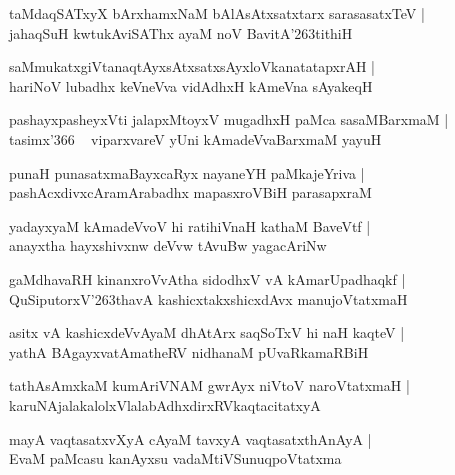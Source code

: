 \documentclass[twoside,12pt,openright]{book}
\def\S{\char'263}
\newcounter{shloka}[chapter]
\begin{document}
\begin{shloka}
taMdaqSATxyX bArxhamxNaM bAlAsAtxsatxtarx sarasasatxTeV |\\
ja{}haqSuH kwtukAviSAThx ayaM noV BavitA\S tithiH
\end{shloka}

\begin{shloka}
saMmukatxgiVtanaqtAyxsAtxsatxsAyxloVkanatatapxrAH |\\
hariNoV lubadhx keVneVva vidAdhxH kAmeVna sAyakeqH 
\end{shloka}

\begin{shloka}
pashayxpasheyxVti jalapxMtoyxV mugadhxH paMca sasaMBarxmaM |\\
tasimx\char'366 ~ viparxvareV yUni kAmadeVvaBarxmaM yayuH 
\end{shloka}

\begin{shloka}
punaH punasatxmaBayxcaRyx nayaneYH paMkajeYriva |\\
pashAcxdivxcAramArabadhx mapasxroVBiH parasapxraM 
\end{shloka}

\begin{shloka}
yadayxyaM kAmadeVvoV hi ratihiVnaH kathaM BaveVtf |\\
anayxtha hayxshivxnw deVvw tAvuBw yagacAriNw
\end{shloka}

\begin{shloka}
gaMdhavaRH kinanxroVvAtha sidodhxV vA kAmarUpadhaqkf |\\
QuSiputorxV\S thavA kashicxtakxshicxdAvx manujoVtatxmaH 
\end{shloka}

\begin{shloka}
asitx vA kashicxdeVvAyaM dhAtArx saqSoTxV hi naH kaqteV |\\
yathA BAgayxvatAmatheRV nidhanaM pUvaRkamaRBiH 
\end{shloka}

\begin{shloka}
tathAsAmxkaM kumAriVNAM gwrAyx niVtoV naroVtatxmaH |\\
karuNAjalakalolxVlalabAdhxdirxRVkaqtacitatxyA 
\end{shloka}

\begin{shloka}
mayA vaqtasatxvXyA cAyaM tavxyA vaqtasatxthAnAyA |\\
EvaM paMcasu kanAyxsu vadaMtiVSunuqpoVtatxma 
\end{shloka}
\end{document}

